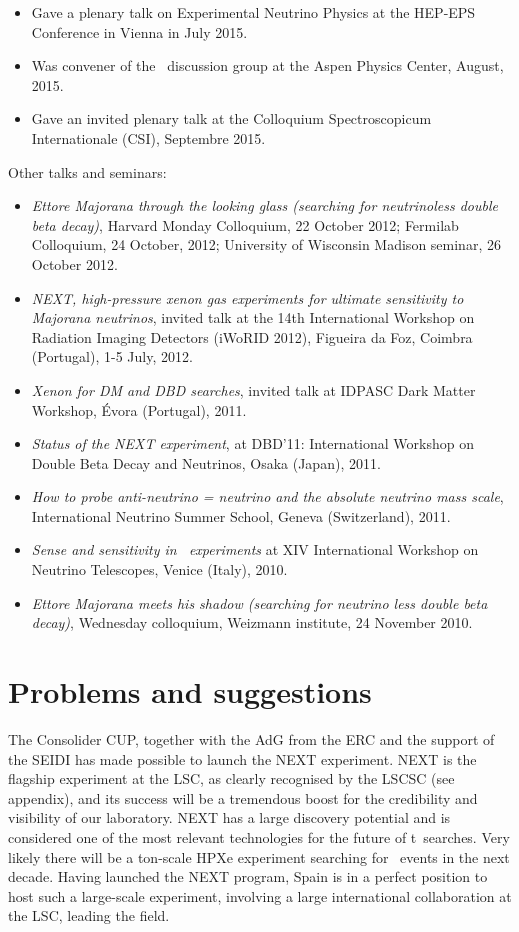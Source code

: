 \documentclass[a4paper,11pt,oneside]{article}
\begin{document}
\begin{itemize}
\item Gave a plenary talk on Experimental Neutrino Physics
at the HEP-EPS Conference in Vienna in July 2015.
\item Was convener of the \bbonu\ discussion group at the Aspen Physics Center, August, 2015.
\item Gave an invited plenary talk at the Colloquium Spectroscopicum Internationale (CSI), Septembre 2015.
\end{itemize}

Other talks and seminars:

\begin{itemize}
\item \textit{Ettore Majorana through the looking glass (searching for neutrinoless double beta decay)}, Harvard Monday Colloquium, 22 October 2012; Fermilab Colloquium, 24 October, 2012; University of Wisconsin Madison seminar, 26 October 2012.
\item \textit{NEXT, high-pressure xenon gas experiments for ultimate sensitivity to Majorana neutrinos}, invited talk at the 14th International Workshop on Radiation Imaging Detectors (iWoRID 2012), Figueira da Foz, Coimbra (Portugal), 1-5 July, 2012. 
\item \textit{Xenon for DM and DBD searches}, invited talk at IDPASC Dark Matter Workshop, \'Evora (Portugal), 2011.
\item \textit{Status of the NEXT experiment}, at DBD'11: International Workshop on Double Beta Decay and Neutrinos, Osaka (Japan), 2011.
\item \textit{How to probe anti-neutrino = neutrino and the absolute neutrino mass scale}, International Neutrino Summer School, Geneva (Switzerland), 2011.
\item \textit{Sense and sensitivity in \bbonu\ experiments} at XIV International Workshop on Neutrino Telescopes, Venice (Italy), 2010.
\item {\it Ettore Majorana meets his shadow (searching for neutrino less double beta decay)}, Wednesday colloquium, Weizmann institute, 24 November 2010.
\end{itemize}


\section{\bf \textsf{Problems and suggestions}}

The Consolider CUP, together with the AdG from the ERC and the support of the SEIDI has made possible to launch the NEXT experiment. NEXT is the flagship experiment at the LSC, as clearly recognised by the LSCSC (see appendix), and its success will be a tremendous boost for the credibility and visibility of our laboratory. NEXT has a large discovery potential and is considered one of the most relevant technologies for the future of t\bbonu\ searches. Very likely there will be a ton-scale HPXe experiment searching for \bbonu\ events in the next decade. Having launched the NEXT program, Spain is in a perfect position to host such a large-scale experiment, involving a large international collaboration at the LSC, leading the field. 
\end{document}
